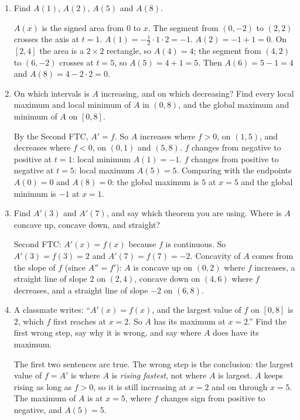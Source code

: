 \documentclass[11pt]{article}
\begin{document}
\begin{enumerate}
\item {\color{gray!55!black}Find $A(1)$, $A(2)$, $A(5)$ and $A(8)$.}

\smallskip
$A(x)$ is the signed area from $0$ to $x$. The segment from $(0,-2)$ to $(2,2)$ crosses
the axis at $t=1$. $A(1)=-\tfrac12\cdot1\cdot2=-1$. $A(2)=-1+1=0$. On $[2,4]$ the area is a
$2\times2$ rectangle, so $A(4)=4$; the segment from $(4,2)$ to $(6,-2)$ crosses at $t=5$, so
$A(5)=4+1=5$. Then $A(6)=5-1=4$ and $A(8)=4-2\cdot2=0$.
\item {\color{gray!55!black}On which intervals is $A$ increasing, and on which decreasing? Find every local maximum
and local minimum of $A$ in $(0,8)$, and the global maximum and minimum of $A$ on $[0,8]$.}

\smallskip
By the Second FTC, $A'=f$. So $A$ increases where $f>0$, on $(1,5)$, and decreases
where $f<0$, on $(0,1)$ and $(5,8)$. $f$ changes from negative to positive at $t=1$: local
minimum $A(1)=-1$. $f$ changes from positive to negative at $t=5$: local maximum $A(5)=5$.
Comparing with the endpoints $A(0)=0$ and $A(8)=0$: the global maximum is $5$ at $x=5$
and the global minimum is $-1$ at $x=1$.
\item {\color{gray!55!black}Find $A'(3)$ and $A'(7)$, and say which theorem you are using. Where is $A$ concave up,
concave down, and straight?}

\smallskip
Second FTC: $A'(x)=f(x)$ because $f$ is continuous. So $A'(3)=f(3)=2$ and $A'(7)=f(7)=-2$.
Concavity of $A$ comes from the slope of $f$ (since $A''=f'$): $A$ is concave up on $(0,2)$
where $f$ increases, a straight line of slope $2$ on $(2,4)$, concave down on $(4,6)$ where
$f$ decreases, and a straight line of slope $-2$ on $(6,8)$.
\item {\color{gray!55!black}A classmate writes: ``$A'(x)=f(x)$, and the largest value of $f$ on $[0,8]$ is $2$,
which $f$ first reaches at $x=2$. So $A$ has its maximum at $x=2$.'' Find the first wrong
step, say why it is wrong, and say where $A$ does have its maximum.}

\smallskip
The first two sentences are true. The wrong step is the conclusion: the largest value of
$f=A'$ is where $A$ is \emph{rising fastest}, not where $A$ is largest. $A$ keeps rising as
long as $f>0$, so it is still increasing at $x=2$ and on through $x=5$. The maximum of $A$
is at $x=5$, where $f$ changes sign from positive to negative, and $A(5)=5$.
\end{enumerate}
\end{document}
